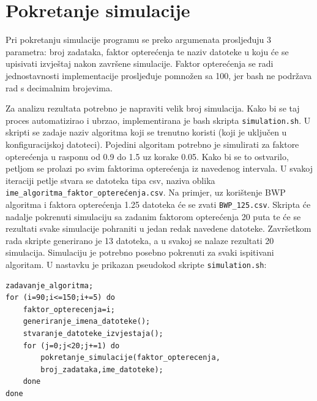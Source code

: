 \documentclass[../zavrsni.tex]{subfiles}
\begin{document}
\section{Pokretanje simulacije}

Pri pokretanju simulacije programu se preko argumenata prosljeđuju 3 parametra: broj zadataka, 
faktor opterećenja te naziv datoteke u koju će se upisivati izvještaj nakon završene simulacije.
Faktor opterećenja se radi jednostavnosti implementacije prosljeđuje pomnožen sa 100, jer bash ne podržava rad s decimalnim brojevima.

Za analizu rezultata potrebno je napraviti velik broj simulacija. Kako bi se taj proces automatizirao i ubrzao, implementirana 
je bash skripta \texttt{simulation.sh}. U skripti se zadaje naziv algoritma koji se trenutno koristi (koji je uključen u 
konfiguracijskoj datoteci). Pojedini algoritam potrebno je simulirati za faktore opterećenja u rasponu od 0.9 do 1.5 uz korake 0.05.
Kako bi se to ostvarilo, petljom se prolazi po svim faktorima opterećenja iz navedenog intervala. U svakoj iteraciji petlje stvara se datoteka tipa
csv, naziva oblika \texttt{{ime\_algoritma}\_{faktor\_opterećenja}.csv}. Na primjer, uz korištenje BWP algoritma i faktora opterećenja 1.25 
datoteka će se zvati \texttt{BWP\_125.csv}. Skripta će nadalje pokrenuti simulaciju sa zadanim faktorom opterećenja 20 puta te će se rezultati 
svake simulacije pohraniti u jedan redak navedene datoteke. Završetkom rada skripte generirano je 13 datoteka, a u svakoj se nalaze rezultati 
20 simulacija. Simulaciju je potrebno posebno pokrenuti za svaki ispitivani algoritam. U nastavku je prikazan pseudokod skripte \texttt{simulation.sh}: 

\begin{lstlisting}[style=CStyle,caption={Pseudokod skripte \texttt{simulation.sh}},captionpos=b]
zadavanje_algoritma;
for (i=90;i<=150;i+=5) do
	faktor_opterecenja=i;
	generiranje_imena_datoteke();
	stvaranje_datoteke_izvjestaja();
	for (j=0;j<20;j+=1) do
		pokretanje_simulacije(faktor_opterecenja,
        broj_zadataka,ime_datoteke);
	done
done
\end{lstlisting}
\end{document}
